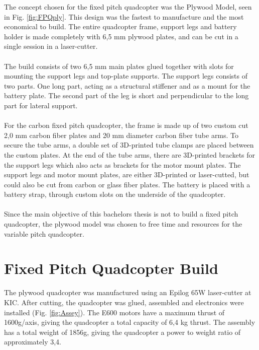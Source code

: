 The concept chosen for the fixed pitch quadcopter was the Plywood Model, seen in Fig. \ref{fig:FPQply}. This design was the fastest to manufacture and the most economical to build. The entire quadcopter frame, support legs and battery holder is made completely with 6,5 mm plywood plates, and can be cut in a single session in a laser-cutter. 
\\\\
The build consists of two 6,5 mm main plates glued together with slots for mounting the support legs and top-plate supports. The support legs consists of two parts. One long part, acting as a structural stiffener and as a mount for the battery plate. The second part of the leg is short and perpendicular to the long part for lateral support.
\\\\
For the carbon fixed pitch quadcopter, the frame is made up of two custom cut 2,0 mm carbon fiber plates and 20 mm diameter carbon fiber tube arms. To secure the tube arms, a double set of 3D-printed tube clamps are placed between the custom plates. At the end of the tube arms, there are 3D-printed brackets for the support legs which also acts as brackets for the motor mount plates. The support legs and motor mount plates, are either 3D-printed or laser-cutted, but could also be cut from carbon or glass fiber plates. The battery is placed with a battery strap, through custom slots on the underside of the quadcopter.
\\\\
Since the main objective of this bachelors thesis is not to build a fixed pitch quadcopter, the plywood model was chosen to free time and resources for the variable pitch quadcopter.

\section{Fixed Pitch Quadcopter Build}
\label{sec;FPQply}
The plywood quadcopter was manufactured using an Epilog 65W laser-cutter at KIC. After cutting, the quadcopter was glued, assembled and electronics were installed (Fig. \ref{fig:Assey}). The E600 motors have a maximum thrust of 1600g/axis, giving the quadcopter a total capacity of 6,4 kg thrust. The assembly has a total weight of 1856g, giving the quadcopter a power to weight ratio of approximately 3,4.


